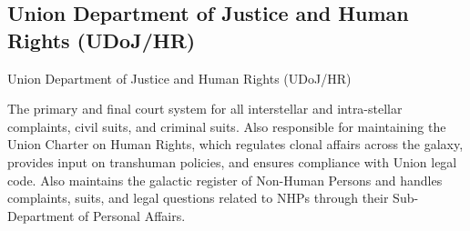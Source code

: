 \subsection{Union Department of Justice and Human Rights (UDoJ/HR)}
Union Department of Justice and Human Rights (UDoJ/HR)

The primary and final court system for all interstellar and intra-stellar complaints, civil suits, and
criminal suits. Also responsible for maintaining the Union Charter on Human Rights, which
regulates clonal affairs across the galaxy, provides input on transhuman policies, and ensures
compliance with Union legal code. Also maintains the galactic register of Non-Human Persons
and handles complaints, suits, and legal questions related to NHPs through their Sub-
Department of Personal Affairs.